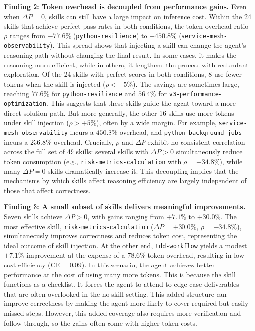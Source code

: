 \documentclass{article}
\begin{document}
\textbf{Finding 2: Token overhead is decoupled from performance gains.}
Even when $\Delta P = 0$, skills can still have a large impact on inference cost.
Within the 24 skills that achieve perfect pass rates in both conditions, the token overhead ratio $\rho$ ranges from $-77.6\%$ (\texttt{python-resilience}) to $+450.8\%$ (\texttt{service-mesh-observability}).
This spread shows that injecting a skill can change the agent’s reasoning path without changing the final result. In some cases, it makes the reasoning more efficient, while in others, it lengthens the process with redundant exploration.
Of the 24 skills with perfect scores in both conditions, 8 use fewer tokens when the skill is injected ($\rho < -5\%$). The savings are sometimes large, reaching $77.6\%$ for \texttt{python-resilience} and $56.4\%$ for \texttt{v3-performance-optimization}. This suggests that these skills guide the agent toward a more direct solution path.
But more generally, the other 16 skills use more tokens under skill injection ($\rho > +5\%$), often by a wide margin. For example, \texttt{service-mesh-observability} incurs a $450.8\%$ overhead, and \texttt{python-background-jobs} incurs a $236.8\%$ overhead. 
Crucially, $\rho$ and $\Delta P$ exhibit no consistent correlation across the full set of 49 skills: several skills with $\Delta P > 0$ simultaneously reduce token consumption (e.g., \texttt{risk-metrics-calculation} with $\rho = -34.8\%$), while many $\Delta P = 0$ skills dramatically increase it.
This decoupling implies that the mechanisms by which skills affect reasoning efficiency are largely independent of those that affect correctness.

\textbf{Finding 3: A small subset of skills delivers meaningful improvements.}
Seven skills achieve $\Delta P > 0$, with gains ranging from $+7.1\%$ to $+30.0\%$.
The most effective skill, \texttt{risk-metrics-calculation} ($\Delta P = +30.0\%$, $\rho = -34.8\%$), simultaneously improves correctness and reduces token cost, representing the ideal outcome of skill injection.
At the other end, \texttt{tdd-workflow} yields a modest $+7.1\%$ improvement at the expense of a $78.6\%$ token overhead, resulting in low cost efficiency ($\mathrm{CE} = 0.09$).
In this scenario, the agent achieves better performance at the cost of using many more tokens.
This is because the skill functions as a checklist. It forces the agent to attend to edge case deliverables that are often overlooked in the no-skill setting. 
This added structure can improve correctness by making the agent more likely to cover required but easily missed steps. 
However, this added coverage also requires more verification and follow-through, so the gains often come with higher token costs.
\end{document}
